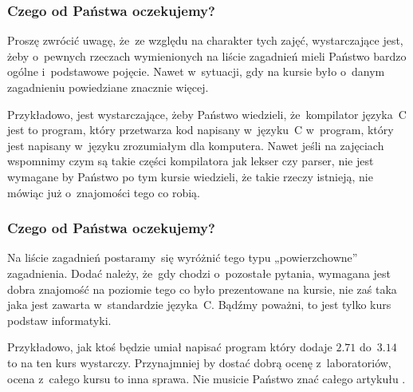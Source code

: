 \documentclass[10pt,t]{beamer}
\begin{document}
\begin{frame}
  \frametitle{Czego od Państwa oczekujemy?}


  Proszę zwrócić uwagę, że~ze względu na charakter tych zajęć, wystarczające
  jest, żeby o~pewnych rzeczach wymienionych na liście zagadnień mieli
  Państwo bardzo ogólne i~podstawowe pojęcie. Nawet w~sytuacji, gdy na
  kursie było o~danym zagadnieniu powiedziane znacznie więcej.

  Przykładowo, jest wystarczające, żeby Państwo wiedzieli, że~kompilator
  języka~C jest to program, który przetwarza kod napisany w~języku~C
  w~program, który jest napisany w~języku zrozumiałym dla komputera.
  Nawet jeśli na zajęciach wspomnimy czym są takie części kompilatora
  jak lekser czy parser, nie jest wymagane by Państwo po tym kursie
  wiedzieli, że takie rzeczy istnieją, nie mówiąc już o~znajomości tego
  co robią.

\end{frame}





\begin{frame}
  \frametitle{Czego od Państwa oczekujemy?}


  Na liście zagadnień postaramy~się wyróżnić tego typu „powierzchowne”
  zagadnienia. Dodać należy, że~gdy chodzi o~pozostałe pytania, wymagana
  jest dobra znajomość na \alert{poziomie tego co było prezentowane na
    kursie}, nie zaś taka jaka jest zawarta w~standardzie języka~C.
  Bądźmy poważni, to jest tylko kurs podstaw informatyki.

  Przykładowo, jak ktoś będzie umiał napisać program który dodaje $2.71$
  do~$3.14$ to na \alert{ten} kurs wystarczy. Przynajmniej by dostać dobrą
  ocenę z~laboratoriów, ocena z~\alert{całego} kursu to inna sprawa.
  Nie musicie Państwo znać całego artykułu
  .


\end{frame}
\end{document}
